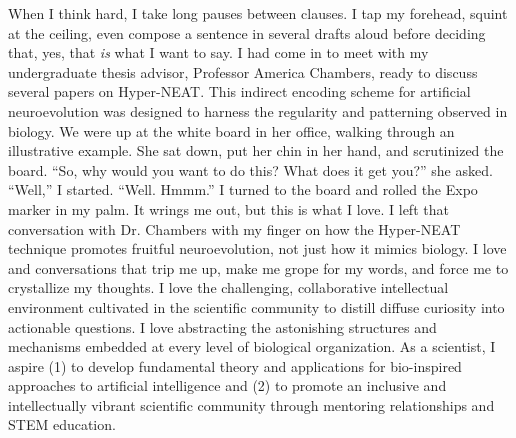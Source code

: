 When I think hard, I take long pauses between clauses.
I tap my forehead, squint at the ceiling, even compose a sentence in several drafts aloud before deciding that, yes, that \textit{is} what I want to say.
I had come in to meet with my undergraduate thesis advisor, Professor America Chambers, ready to discuss several papers on Hyper-NEAT.
This indirect encoding scheme for artificial neuroevolution was designed to harness the regularity and patterning observed in biology.
We were up at the white board in her office, walking through an illustrative example.
She sat down, put her chin in her hand, and scrutinized the board.
``So, why would you want to do this? What does it get you?'' she asked.
``Well,'' I started.
``Well.
Hmmm.''
I turned to the board and rolled the Expo marker in my palm.
It wrings me out, but this is what I love.
I left that conversation with Dr. Chambers with my finger on how the Hyper-NEAT technique promotes fruitful neuroevolution, not just how it mimics biology.
I love and conversations that trip me up, make me grope for my words, and force me to crystallize my thoughts.
I love the challenging, collaborative intellectual environment cultivated in the scientific community to distill diffuse curiosity into actionable questions.
I love abstracting the astonishing structures and mechanisms embedded at every level of biological organization.
As a scientist, I aspire
(1) to develop fundamental theory and applications for bio-inspired approaches to artificial intelligence and
(2) to promote an inclusive and intellectually vibrant scientific community through mentoring relationships and STEM education.
